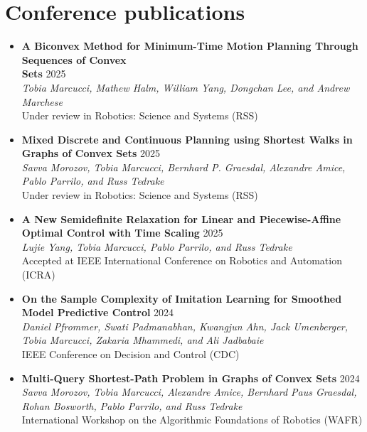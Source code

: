 \documentclass[11pt,a4paper,sans]{moderncv}
\begin{document}
\section{Conference publications}

\vspace{5pt}

\begin{itemize}
	
\item \textbf{A Biconvex Method for Minimum-Time Motion Planning Through Sequences of Convex \\ Sets} \hfill 2025 \\
\textit{Tobia Marcucci, Mathew Halm, William Yang, Dongchan Lee, and Andrew Marchese } \\
Under review in Robotics: Science and Systems (RSS)

\item \textbf{Mixed Discrete and Continuous Planning using Shortest Walks in Graphs of Convex Sets} \hfill 2025 \\
\textit{Savva Morozov, Tobia Marcucci, Bernhard P. Graesdal, Alexandre Amice, Pablo Parrilo, and Russ Tedrake} \\
Under review in Robotics: Science and Systems (RSS)
	
\item \textbf{A New Semidefinite Relaxation for Linear and Piecewise-Affine Optimal Control with Time Scaling} \hfill 2025 \\
\textit{Lujie Yang, Tobia Marcucci, Pablo Parrilo, and Russ Tedrake} \\
Accepted at IEEE International Conference on Robotics and Automation (ICRA)
	
\item \textbf{On the Sample Complexity of Imitation Learning for Smoothed Model Predictive Control} \hfill 2024 \\
\textit{Daniel Pfrommer, Swati Padmanabhan, Kwangjun Ahn, Jack Umenberger, Tobia Marcucci, Zakaria Mhammedi, and Ali Jadbabaie} \\
IEEE Conference on Decision and Control (CDC)
	
\item \textbf{Multi-Query Shortest-Path Problem in Graphs of Convex Sets} \hfill 2024 \\
\textit{Savva Morozov, Tobia Marcucci, Alexandre Amice, Bernhard Paus Graesdal,  Rohan Bosworth,  Pablo Parrilo, and Russ Tedrake} \\
International Workshop on the Algorithmic Foundations of Robotics (WAFR)


\end{itemize}
\end{document}
